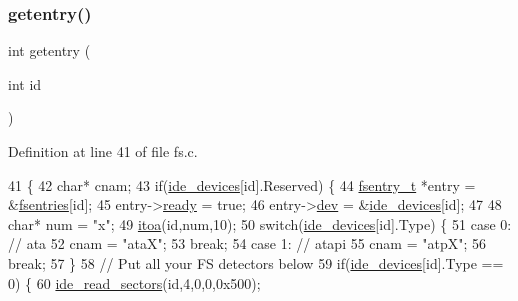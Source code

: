 \subsubsection{\texorpdfstring{getentry()}{getentry()}}
{\footnotesize\ttfamily int getentry (\begin{DoxyParamCaption}\item[{int}]{id }\end{DoxyParamCaption})}



Definition at line 41 of file fs.\+c.


\begin{DoxyCode}
41                      \{
42     \textcolor{keywordtype}{char}* cnam;
43     \textcolor{keywordflow}{if}(\hyperlink{a00035_ab97a828ed4839b575dc382e2bf826e87_ab97a828ed4839b575dc382e2bf826e87}{ide\_devices}[\textcolor{keywordtype}{id}].Reserved) \{
44         \hyperlink{a00272}{fsentry\_t} *entry = &\hyperlink{a00152_a6b46131164b26e476762930c9aae4319_a6b46131164b26e476762930c9aae4319}{fsentries}[id];
45         entry->\hyperlink{a00272_a284522ed97fe1eeebd0fcc039b2ea00a_a284522ed97fe1eeebd0fcc039b2ea00a}{ready} = \textcolor{keyword}{true};
46         entry->\hyperlink{a00272_aaea66ea744fa50f1c54666033884d8d2_aaea66ea744fa50f1c54666033884d8d2}{dev} = &\hyperlink{a00035_ab97a828ed4839b575dc382e2bf826e87_ab97a828ed4839b575dc382e2bf826e87}{ide\_devices}[id];
47         
48         \textcolor{keywordtype}{char}* num = \textcolor{stringliteral}{"x"};
49         \hyperlink{a00125_ab42640268f26e065efd044cfe80591bd_ab42640268f26e065efd044cfe80591bd}{itoa}(\textcolor{keywordtype}{id},num,10);
50         \textcolor{keywordflow}{switch}(\hyperlink{a00035_ab97a828ed4839b575dc382e2bf826e87_ab97a828ed4839b575dc382e2bf826e87}{ide\_devices}[\textcolor{keywordtype}{id}].Type) \{
51             \textcolor{keywordflow}{case} 0: \textcolor{comment}{// ata}
52                 cnam = \textcolor{stringliteral}{"ataX"};
53                 \textcolor{keywordflow}{break};
54             \textcolor{keywordflow}{case} 1: \textcolor{comment}{// atapi}
55                 cnam = \textcolor{stringliteral}{"atpX"};
56                 \textcolor{keywordflow}{break};
57         \}
58         \textcolor{comment}{// Put all your FS detectors below}
59         \textcolor{keywordflow}{if}(\hyperlink{a00035_ab97a828ed4839b575dc382e2bf826e87_ab97a828ed4839b575dc382e2bf826e87}{ide\_devices}[\textcolor{keywordtype}{id}].Type == 0) \{
60             \hyperlink{a00032_a9dd84843412753d236e17a15277c5b98_a9dd84843412753d236e17a15277c5b98}{ide\_read\_sectors}(\textcolor{keywordtype}{id},4,0,0,0x500);

\end{DoxyCode}
